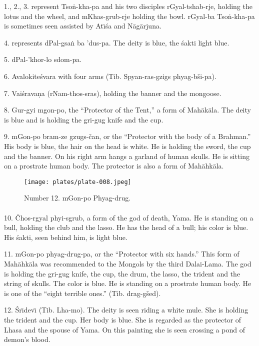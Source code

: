 \documentclass[a4paper, 12pt, oneside]{article}
\begin{document}
1., 2., 3. represent Tso\.{n}-kha-pa and his two disciples rGyal-tshab-rje, holding the lotus and the wheel, and mKhas-grub-rje holding the bowl. rGyal-ba Tso\.{n}-kha-pa is sometimes seen assisted by At\={\i}\'{s}a and N\={a}g\={a}rjuna.

4. represents dPal-gsa\.{n} ba 'dus-pa. The deity is blue, the \'{s}akti light blue.

5. dPal-'khor-lo sdom-pa.

6. Avalokite\'{s}vara with four arms (Tib. Spyan-ras-gzigs phyag-bši-pa).

7. Vai\'{s}rava\d{n}a (rNam-thos-sras), holding the banner and the mongoose.

8. Gur-gyi mgon-po, the ``Protector of the Tent,'' a form of Mah\={a}k\={a}la. The deity is blue and is holding the gri-gug knife and the cup.

9. mGon-po bram-ze gzugs-čan, or the ``Protector with the body of a Brahman.'' His body is blue, the hair on the head is white. He is holding the sword, the cup and the banner. On his right arm hangs a garland of human skulls. He is sitting on a prostrate human body. The protector is also a form of Mah\={a}hk\={a}la.

\clearpage
\begin{figure}[H]
\centering
\texttt{[image: plates/plate-008.jpeg]}
\caption*{Number 12. mGon-po Phyag-drug.}
\end{figure}
\clearpage
\paragraph{}
10. Čhos-rgyal phyi-sgrub, a form of the god of death, Yama. He is standing on a bull, holding the club and the lasso. He has the head of a bull; his color is blue. His \'{s}akti, seen behind him, is light blue.

11. mGon-po phyag-drug-pa, or the ``Protector with six hands.'' This form of Mah\={a}hk\={a}la was recommended to the Mongols by the third Dalai-Lama. The god is holding the gri-gug knife, the cup, the drum, the lasso, the trident and the string of skulls. The color is blue. He is standing on a prostrate human body. He is one of the ``eight terrible ones.'' (Tib. drag-gšed).

12. \'{S}r\={\i}dev\={\i} (Tib. Lha-mo). The deity is seen riding a white mule. She is holding the trident and the cup. Her body is blue. She is regarded as the protector of Lhasa and the spouse of Yama. On this painting she is seen crossing a pond of demon's blood.
\end{document}
